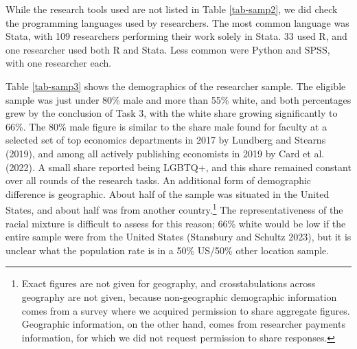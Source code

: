 \documentclass[
  letterpaper,
  DIV=11,
  numbers=noendperiod]{scrartcl}
\begin{document}
While the research tools used are not listed in Table \ref{tab-samp2},
we did check the programming languages used by researchers. The most
common language was Stata, with 109 researchers performing their work
solely in Stata. 33 used R, and one researcher used both R and Stata.
Less common were Python and SPSS, with one researcher each.

Table \ref{tab-samp3} shows the demographics of the researcher sample.
The eligible sample was just under 80\% male and more than 55\% white,
and both percentages grew by the conclusion of Task 3, with the white
share growing significantly to 66\%. The 80\% male figure is similar to
the share male found for faculty at a selected set of top economics
departments in 2017 by Lundberg and Stearns (2019), and among all
actively publishing economists in 2019 by Card et al. (2022). A small
share reported being LGBTQ+, and this share remained constant over all
rounds of the research tasks. An additional form of demographic
difference is geographic. About half of the sample was situated in the
United States, and about half was from another country.\footnote{Exact
  figures are not given for geography, and crosstabulations across
  geography are not given, because non-geographic demographic
  information comes from a survey where we acquired permission to share
  aggregate figures. Geographic information, on the other hand, comes
  from researcher payments information, for which we did not request
  permission to share responses.} The representativeness of the racial
mixture is difficult to assess for this reason; 66\% white would be low
if the entire sample were from the United States (Stansbury and Schultz
2023), but it is unclear what the population rate is in a 50\% US/50\%
other location sample.
\end{document}
